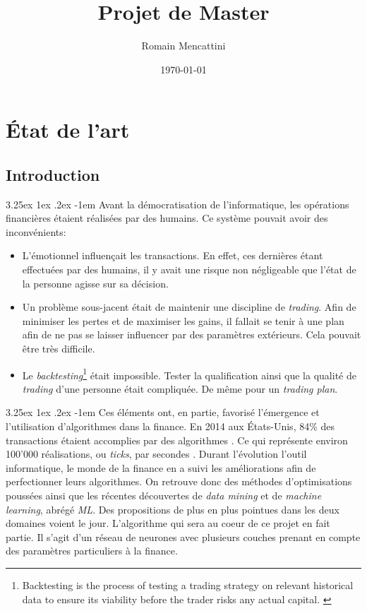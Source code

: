\documentclass[a4paper, 11pt]{article}
\title{Projet de Master}
\author{Romain Mencattini}
\date{\today}
\makeatletter
\renewcommand\paragraph{\@startsection{paragraph}{5}{\z@}%
  {3.25ex \@plus1ex \@minus.2ex}%
  {-1em}%
  {\normalfont\normalsize\bfseries}}
\makeatother
\begin{document}
\maketitle
\newpage
\tableofcontents
\newpage

\section{État de l'art}
\subsection{Introduction}
\paragraph{}
Avant la démocratisation de l'informatique, les opérations financières étaient réalisées par des humains. Ce système pouvait avoir des inconvénients:
\begin{itemize}
\item L'émotionnel influençait les transactions. En effet, ces dernières étant effectuées par des humains, il y avait une risque non négligeable que l'état de la personne agisse sur sa décision.
\item Un problème sous-jacent était de maintenir une discipline de \textit{trading}. Afin de minimiser les pertes et de maximiser les gains, il fallait se tenir à une plan afin de ne pas se laisser influencer par des paramètres extérieurs. Cela pouvait être très difficile.
\item Le \textit{backtesting}\footnote{Backtesting is the process of testing a trading strategy on relevant historical data to ensure its viability before the trader risks any actual capital. \cite{investopedia_backtesting}} était impossible. Tester la qualification ainsi que la qualité de \textit{trading} d'une personne était compliquée. De même pour un \textit{trading plan}.
\end{itemize}

\paragraph{}
Ces éléments ont, en partie, favorisé l'émergence et l'utilisation d'algorithmes dans la finance. En 2014 aux États-Unis, 84\% des transactions étaient accomplies par des algorithmes \cite{real_investors}. Ce qui représente environ 100'000 réalisations, ou \textit{ticks}, par secondes \cite{real_investors}.
Durant l'évolution l'outil informatique, le monde de la finance en a suivi les améliorations afin de perfectionner leurs algorithmes.
On retrouve donc des méthodes d'optimisations poussées ainsi que les récentes découvertes de \textit{data mining} et de \textit{machine learning}, abrégé \textit{ML}. Des propositions de plus en plus pointues dans les deux domaines voient le jour. L'algorithme qui sera au coeur de ce projet en fait partie. Il s'agit d'un réseau de neurones avec plusieurs couches prenant en compte des paramètres particuliers à la finance.
\end{document}
